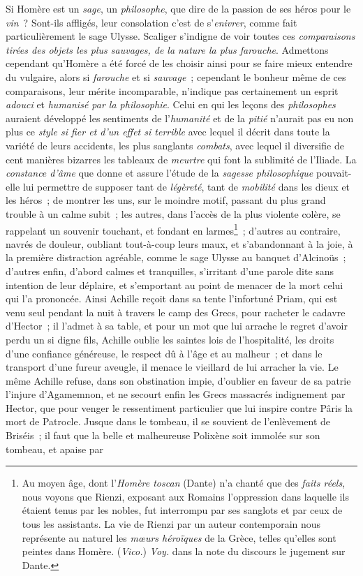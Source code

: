 \documentclass[french,twoside]{book} %
\begin{document}
Si Homère est un {\itshape sage}, un {\itshape philosophe}, que dire de la passion de ses héros pour le {\itshape vin} ? Sont-ils affligés, leur consolation c’est de s’{\itshape enivrer}, comme fait particulièrement le sage Ulysse. Scaliger s’indigne de voir toutes ces {\itshape comparaisons tirées des objets les plus sauvages, de la nature la plus farouche}. Admettons cependant qu’Homère a été forcé de les choisir ainsi pour se faire mieux entendre du vulgaire, alors si {\itshape farouche} et si {\itshape sauvage} ; cependant le bonheur même de ces comparaisons, leur mérite incomparable, n’indique pas certainement un esprit  {\itshape adouci} et {\itshape humanisé par la philosophie}. Celui en qui les leçons des {\itshape philosophes} auraient développé les sentiments de l’{\itshape humanité} et de la {\itshape pitié} n’aurait pas eu non plus ce {\itshape style si fier et d’un effet si terrible} avec lequel il décrit dans toute la variété de leurs accidents, les plus sanglants {\itshape combats}, avec lequel il diversifie de cent manières bizarres les tableaux de {\itshape meurtre} qui font la sublimité de l’Iliade. La {\itshape constance d’âme} que donne et assure l’étude de la {\itshape sagesse philosophique} pouvait-elle lui permettre de supposer tant de {\itshape légèreté}, tant de {\itshape mobilité} dans les dieux et les héros ; de montrer les uns, sur le moindre motif, passant du plus grand trouble à un calme subit ; les autres, dans l’accès de la plus violente colère, se rappelant un souvenir touchant, et fondant en larmes\footnote{Au moyen âge, dont l’{\itshape Homère toscan} (Dante) n’a chanté que des {\itshape faits réels}, nous voyons que Rienzi, exposant aux Romains l’oppression dans laquelle ils étaient tenus par les nobles, fut interrompu par ses sanglots et par ceux de tous les assistants. La vie de Rienzi par un auteur contemporain nous représente au naturel les {\itshape mœurs héroïques} de la Grèce, telles qu’elles sont peintes dans Homère. ({\itshape Vico.}) {\itshape Voy.} dans la note du discours le jugement sur Dante.} ; d’autres au contraire, navrés de douleur, oubliant tout-à-coup leurs maux, et s’abandonnant à la joie, à la première distraction agréable, comme le sage Ulysse au banquet d’Alcinoüs ; d’autres enfin, d’abord calmes et tranquilles, s’irritant d’une parole dite sans intention de leur déplaire, et s’emportant au point de menacer de la mort celui qui l’a prononcée. Ainsi Achille reçoit dans sa tente l’infortuné Priam, qui est  venu seul pendant la nuit à travers le camp des Grecs, pour racheter le cadavre d’Hector ; il l’admet à sa table, et pour un mot que lui arrache le regret d’avoir perdu un si digne fils, Achille oublie les saintes lois de l’hospitalité, les droits d’une confiance généreuse, le respect dû à l’âge et au malheur ; et dans le transport d’une fureur aveugle, il menace le vieillard de lui arracher la vie. Le même Achille refuse, dans son obstination impie, d’oublier en faveur de sa patrie l’injure d’Agamemnon, et ne secourt enfin les Grecs massacrés indignement par Hector, que pour venger le ressentiment particulier que lui inspire contre Pâris la mort de Patrocle. Jusque dans le tombeau, il se souvient de l’enlèvement de Briséis ; il faut que la belle et malheureuse Polixène soit immolée sur son tombeau, et apaise par 
\end{document}
